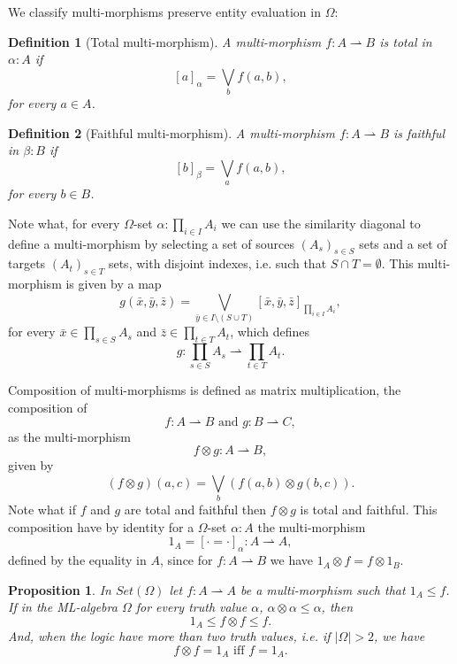 \documentclass[oribibl]{llncs}
\newtheorem{prop}{Proposition}
\newtheorem{defn}{Definition}
\begin{document}
We classify multi-morphisms preserve entity evaluation in $\Omega$:
 \begin{defn}[Total multi-morphism]\label{total}
 A multi-morphism $f:A\rightharpoonup B$ is \emph{total} in $\alpha:A$ if \[[a]_\alpha=\bigvee_b f(a,b),\]
 for every $a\in A$.
 \end{defn}

 \begin{defn}[Faithful multi-morphism]\label{total}
 A multi-morphism $f:A\rightharpoonup B$ is \emph{faithful} in $\beta:B$ if \[[b]_\beta=\bigvee_a f(a,b),\]
 for every $b\in B$.
 \end{defn}

 Note what, for every $\Omega$-set $\alpha:\prod_{i\in I}A_i$ we can use the similarity diagonal to define a multi-morphism by selecting a set of sources $(A_s)_{s\in S}$ sets and a set of targets $(A_t)_{s\in T}$ sets, with disjoint indexes, i.e. such that $S\cap T=\emptyset$. This multi-morphism is given by a map
 \[
 g(\bar{x},\bar{y},\bar{z})=\bigvee_{\bar{y}\in I\setminus(S\cup T)}[\bar{x},\bar{y},\bar{z}]_{\prod_{i\in I}A_i},
 \]
 for every $\bar{x}\in\prod_{s\in S}A_s$ and $\bar{z}\in\prod_{t\in T}A_t$, which defines
 \[ g:\prod_{s\in S}A_s\rightharpoonup\prod_{t\in T}A_t.\]

 Composition of multi-morphisms  is defined as matrix multiplication, the composition of
\[
f:A\rightharpoonup B \text{ and } g:B\rightharpoonup C,
\]
as the multi-morphism
\[ f\otimes g:A\rightharpoonup B, \]
given by
\[
(f\otimes g)(a,c)=\bigvee_b(f(a,b)\otimes g(b,c)).
\]
Note what if $f$ and $g$ are total and faithful then $f\otimes g$ is total and faithful. This composition have by identity for a $\Omega$-set $\alpha:A$ the multi-morphism \[1_A=[\cdot=\cdot]_\alpha:A\rightharpoonup A,\] defined by the equality in $A$, since for $f:A\rightharpoonup B$ we have $1_A\otimes f = f\otimes 1_B$.

\begin{prop}\label{prop:comprestriction} In $Set(\Omega)$ let $f:A\rightharpoonup A$ be a multi-morphism such that $1_A\leq f$. If in the ML-algebra $\Omega$ for every truth value $\alpha$, $\alpha\otimes\alpha\leq\alpha$, then \[1_A\leq f\otimes f\leq f.\] And, when the logic have more than two truth values, i.e. if $|\Omega|>2$, we have
\[f\otimes f = 1_A \text{ iff }f=1_A.\]
\end{prop}
\end{document}
